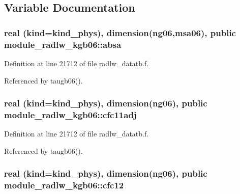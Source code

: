 \subsection{Variable Documentation}
\subsubsection[{\texorpdfstring{absa}{absa}}]{\setlength{\rightskip}{0pt plus 5cm}real (kind=kind\+\_\+phys), dimension(ng06,{\bf msa06}), public module\+\_\+radlw\+\_\+kgb06\+::absa}\hypertarget{namespacemodule__radlw__kgb06_a21bd40309855c89a64b88be171bfde59}{}\label{namespacemodule__radlw__kgb06_a21bd40309855c89a64b88be171bfde59}


Definition at line 21712 of file radlw\+\_\+datatb.\+f.



Referenced by taugb06().

\subsubsection[{\texorpdfstring{cfc11adj}{cfc11adj}}]{\setlength{\rightskip}{0pt plus 5cm}real (kind=kind\+\_\+phys), dimension(ng06), public module\+\_\+radlw\+\_\+kgb06\+::cfc11adj}\hypertarget{namespacemodule__radlw__kgb06_a8b0813723ba69b1afbe2552f6b730267}{}\label{namespacemodule__radlw__kgb06_a8b0813723ba69b1afbe2552f6b730267}


Definition at line 21712 of file radlw\+\_\+datatb.\+f.



Referenced by taugb06().

\subsubsection[{\texorpdfstring{cfc12}{cfc12}}]{\setlength{\rightskip}{0pt plus 5cm}real (kind=kind\+\_\+phys), dimension(ng06), public module\+\_\+radlw\+\_\+kgb06\+::cfc12}\hypertarget{namespacemodule__radlw__kgb06_a44f5934520edc537b5df004774b0ef71}{}\label{namespacemodule__radlw__kgb06_a44f5934520edc537b5df004774b0ef71}


